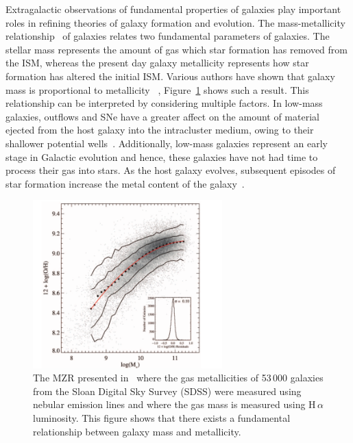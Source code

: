 Extragalactic observations of fundamental properties of galaxies play important roles in refining theories of galaxy formation and evolution.
The mass-metallicity relationship~\citep[MZR;][]{Lequeux79} of galaxies relates two fundamental parameters of galaxies.
The stellar mass represents the amount of gas which star formation has removed from the ISM, whereas the present day galaxy metallicity represents how star formation has altered the initial ISM.
Various authors have shown that galaxy mass is proportional to metallicity
~\citep{Tremonti04, Maiolino08,Kewley08}, Figure~\ref{fig:MZR} shows such a result.
This relationship can be interpreted by considering multiple factors.
In low-mass galaxies, outflows and SNe have a greater affect on the amount of material ejected from the host galaxy into the intracluster medium, owing to their shallower potential wells~\citep[e.g.][]{Tremonti04}.
Additionally, low-mass galaxies represent an early stage in Galactic evolution and hence, these galaxies have not had time to process their gas into stars.
As the host galaxy evolves, subsequent episodes of star formation increase the metal content of the galaxy~\citep[e.g.][and references therein]{Maiolino08}.


\begin{figure}
 \centering
 \includegraphics[width=0.65\textwidth]{intro/MZR}
 \caption[Tremonti et al. Mass-metallicity relationship]{The MZR presented in~\citep{Tremonti04} where the gas metallicities of 53\,000 galaxies from the Sloan Digital Sky Survey (SDSS) were measured using nebular emission lines and where the gas mass is measured using H\,$\alpha$ luminosity.
 This figure shows that there exists a fundamental relationship between galaxy mass and metallicity.
 \label{fig:MZR}}
\end{figure}

